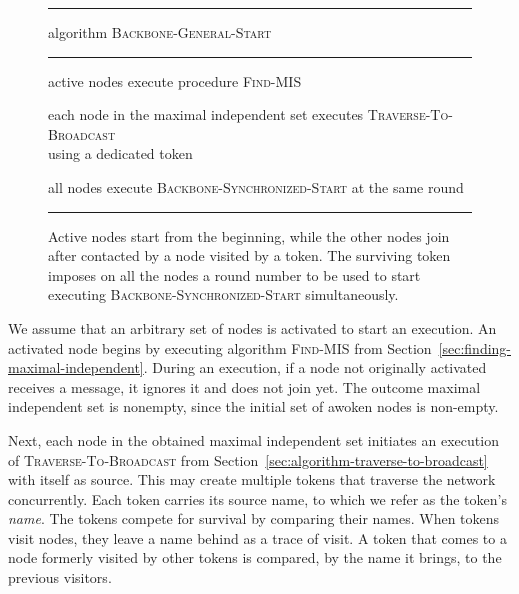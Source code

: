 \documentclass[11pt]{article}
\newcommand{\FF}{\vspace*{\medskipamount}}
\begin{document}
\begin{figure}[t]
\hrule

\FF

\textsf{algorithm} \textsc{Backbone-General-Start} 

\FF

\hrule

\FF

\begin{description}[nosep]
\item[\sf stage 1:] active nodes execute procedure \textsc{Find-MIS} 

\item[\sf stage 2:] each node in the maximal independent set executes \textsc{Traverse-To-Broadcast}\\ using a dedicated token

\item[\sf stage 3:]  all nodes execute \textsc{Backbone-Synchronized-Start} at the same round


\end{description}

\FF

\hrule

\FF

\caption{\label{alg:Backbone-General-Start}
Active nodes start from the beginning, while the other nodes join after contacted by a node visited by a token.
The surviving token imposes on all the nodes a round number to be used to start executing \textsc{Backbone-Synchronized-Start} simultaneously.}
\end{figure}


We assume that an arbitrary set of nodes is activated to start an execution.
An activated node begins by executing algorithm \textsc{Find-MIS} from Section~\ref{sec:finding-maximal-independent}. 
During an execution, if a node not originally activated receives a message, it ignores it and does not join yet. 
The outcome maximal independent set is nonempty, since the initial set  of awoken nodes is non-empty.

Next, each node in the obtained maximal independent set initiates an execution of \textsc{Traverse-To-Broadcast} from Section~\ref{sec:algorithm-traverse-to-broadcast} with itself as source.
This may create multiple tokens that traverse the network concurrently.
Each token carries its source name, to which we refer as the token's \emph{name}.
The tokens compete for survival by comparing their names.  
When tokens visit nodes, they leave a name behind as a trace of visit.
A token that comes to a node formerly visited by other tokens is compared, by the name it brings, to the previous visitors.
\end{document}
